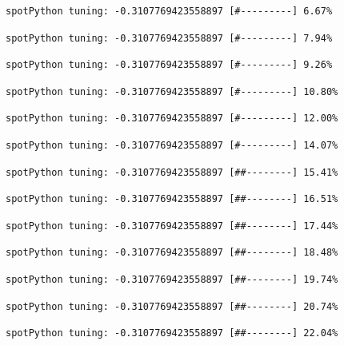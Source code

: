 \documentclass[
  letterpaper,
  DIV=11,
  numbers=noendperiod]{scrreprt}
\begin{document}
\begin{verbatim}
spotPython tuning: -0.3107769423558897 [#---------] 6.67% 
\end{verbatim}

\begin{verbatim}
spotPython tuning: -0.3107769423558897 [#---------] 7.94% 
\end{verbatim}

\begin{verbatim}
spotPython tuning: -0.3107769423558897 [#---------] 9.26% 
\end{verbatim}

\begin{verbatim}
spotPython tuning: -0.3107769423558897 [#---------] 10.80% 
\end{verbatim}

\begin{verbatim}
spotPython tuning: -0.3107769423558897 [#---------] 12.00% 
\end{verbatim}

\begin{verbatim}
spotPython tuning: -0.3107769423558897 [#---------] 14.07% 
\end{verbatim}

\begin{verbatim}
spotPython tuning: -0.3107769423558897 [##--------] 15.41% 
\end{verbatim}

\begin{verbatim}
spotPython tuning: -0.3107769423558897 [##--------] 16.51% 
\end{verbatim}

\begin{verbatim}
spotPython tuning: -0.3107769423558897 [##--------] 17.44% 
\end{verbatim}

\begin{verbatim}
spotPython tuning: -0.3107769423558897 [##--------] 18.48% 
\end{verbatim}

\begin{verbatim}
spotPython tuning: -0.3107769423558897 [##--------] 19.74% 
\end{verbatim}

\begin{verbatim}
spotPython tuning: -0.3107769423558897 [##--------] 20.74% 
\end{verbatim}

\begin{verbatim}
spotPython tuning: -0.3107769423558897 [##--------] 22.04% 
\end{verbatim}
\end{document}
